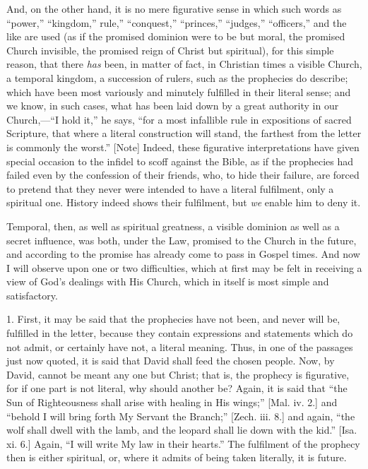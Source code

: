 And, on the other hand, it is no mere figurative sense in which
such words as ``power,'' ``kingdom,'' rule,''
``conquest,'' ``princes,'' ``judges,''
``officers,'' and the like are used (as if the promised
dominion were to be but moral, the promised Church invisible, the
promised reign of Christ but spiritual), for this simple reason, that
there \emph{has} been, in matter of fact, in Christian times a visible
Church, a temporal kingdom, a succession of rulers, such as the
prophecies do describe; which have been most variously and minutely
fulfilled in their literal sense; and we know, in such cases, what has
been laid down by a great authority in our Church,—``I hold
it,'' he says, ``for a most infallible rule in expositions of
sacred Scripture, that where a literal construction will stand, the
farthest from the letter is commonly the worst.'' [Note]
Indeed, these figurative interpretations have given special occasion
to the infidel to scoff against the Bible, as if the prophecies had
failed even by the confession of their friends, who, to hide their
failure, are forced to pretend that they never were intended to have a
literal fulfilment, only a spiritual one. History indeed shows their
fulfilment, but \emph{we} enable him to deny it.

Temporal, then, as well as spiritual greatness, a visible dominion
as well as a secret influence, was both, under the Law, promised to
the Church in the future, and according to the promise has already
come to pass in Gospel times. And now I will observe upon one or two
difficulties, which at first may be felt in receiving a view of God's
dealings with His Church, which in itself is most simple and
satisfactory.

1. First, it may be said that the prophecies have not been, and
never will be, fulfilled in the letter, because they contain
expressions and statements which do not admit, or certainly have not,
a literal meaning. Thus, in one of the passages just now quoted, it is
said that David shall feed the chosen people. Now, by David, cannot be
meant any one but Christ; that is, the prophecy is figurative, for if
one part is not literal, why should another be? Again, it is said that
``the Sun of Righteousness shall arise with healing in His
wings;'' [Mal. iv. 2.] and ``behold I will bring forth My
Servant the Branch;'' [Zech. iii. 8.] and again, ``the wolf
shall dwell with the lamb, and the leopard shall lie down with the
kid.'' [Isa. xi. 6.] Again, ``I will write My law in their
hearts.'' The fulfilment of the prophecy then is either spiritual,
or, where it admits of being taken literally, it is future.

